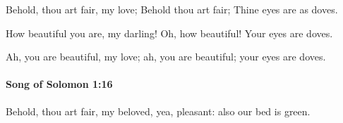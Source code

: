 			\begin{versebox}
					\item[BHS] 
					\item[LXX] 
					\item[ASV] Behold, thou art fair, my love; Behold thou art fair; Thine eyes are as doves.
					\item[NIV] How beautiful you are, my darling! Oh, how beautiful! Your eyes are doves.
					\item[NRSV] Ah, you are beautiful, my love; ah, you are beautiful; your eyes are doves.
			\end{versebox}

		\paragraph{Song of Solomon 1:16} %
			\label{SONGOFSOLOMON-1-16}

			Behold, thou art fair, my beloved, yea, pleasant: also our bed is green.

